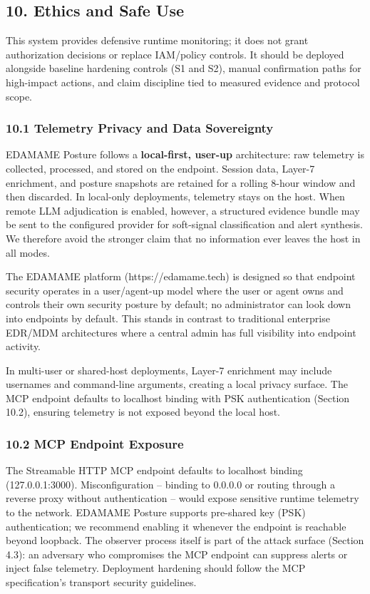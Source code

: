 \documentclass[
]{article}
\begin{document}
\subsection{10. Ethics and Safe Use}\label{ethics-and-safe-use}

This system provides defensive runtime monitoring; it does not grant
authorization decisions or replace IAM/policy controls. It should be
deployed alongside baseline hardening controls (S1 and S2), manual
confirmation paths for high-impact actions, and claim discipline tied to
measured evidence and protocol scope.

\subsubsection{10.1 Telemetry Privacy and Data
Sovereignty}\label{telemetry-privacy-and-data-sovereignty}

EDAMAME Posture follows a \textbf{local-first, user-up} architecture:
raw telemetry is collected, processed, and stored on the endpoint.
Session data, Layer-7 enrichment, and posture snapshots are retained for
a rolling 8-hour window and then discarded. In local-only deployments,
telemetry stays on the host. When remote LLM adjudication is enabled,
however, a structured evidence bundle may be sent to the configured
provider for soft-signal classification and alert synthesis. We
therefore avoid the stronger claim that no information ever leaves the
host in all modes.

The EDAMAME platform (https://edamame.tech) is designed so that endpoint
security operates in a user/agent-up model where the user or agent owns
and controls their own security posture by default; no administrator can
look down into endpoints by default. This stands in contrast to
traditional enterprise EDR/MDM architectures where a central admin has
full visibility into endpoint activity.

In multi-user or shared-host deployments, Layer-7 enrichment may include
usernames and command-line arguments, creating a local privacy surface.
The MCP endpoint defaults to localhost binding with PSK authentication
(Section 10.2), ensuring telemetry is not exposed beyond the local host.

\subsubsection{10.2 MCP Endpoint Exposure}\label{mcp-endpoint-exposure}

The Streamable HTTP MCP endpoint defaults to localhost binding
(127.0.0.1:3000). Misconfiguration -- binding to 0.0.0.0 or routing
through a reverse proxy without authentication -- would expose sensitive
runtime telemetry to the network. EDAMAME Posture supports pre-shared
key (PSK) authentication; we recommend enabling it whenever the endpoint
is reachable beyond loopback. The observer process itself is part of the
attack surface (Section 4.3): an adversary who compromises the MCP
endpoint can suppress alerts or inject false telemetry. Deployment
hardening should follow the MCP specification's transport security
guidelines.
\end{document}
